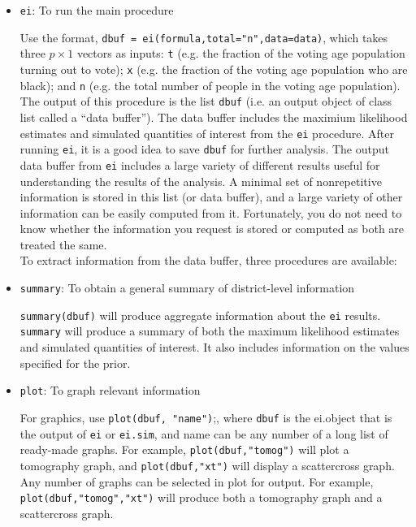 \documentclass[11pt,oneside,letterpaper,titlepage]{article}
\begin{document}
\begin{itemize}
\item{{\verb#ei#}: To run the main procedure}

  Use the format, \verb#dbuf = ei(formula,total="n",data=data)#, which takes three $
  p\times 1$ vectors as inputs: \verb#t# (e.g. the fraction of the
  voting age population turning out to vote); \verb#x# (e.g. the
  fraction of the voting age population who are black); and \verb#n#
  (e.g. the total number of people in the voting age population). The output of this
  procedure is the list \verb#dbuf# (i.e. an output object of class
  list called a ``data buffer'').  The data buffer includes the maximium likelihood estimates and simulated quantities of interest from the \verb#ei# procedure. After running \verb#ei#, it is a
  good idea to save \verb#dbuf# for further analysis.  The
  output data buffer from \verb#ei# includes a large variety of
  different results useful for understanding the results of the
  analysis. A minimal set of nonrepetitive information is stored in
  this list (or data buffer), and a large variety of other information
  can be easily computed from it. Fortunately, you do not need to know
  whether the information
  you request is stored or computed as both are treated the same.\\
  \newline To extract information from the data buffer, three
  procedures are available:

\item{{\verb#summary#}: To obtain a general summary of district-level information}

  \verb#summary(dbuf)# will produce aggregate information about the
  \verb#ei# results.  \verb#summary# will produce a summary of both the maximum likelihood estimates and simulated quantities of interest. It also includes information on the values specified for the prior.

\item{{\verb#plot#}: To graph relevant information}

  For graphics, use \verb#plot(dbuf, "name")#;, where \verb#dbuf# is
  the ei.object that is the output of \verb#ei# or \verb#ei.sim#, and name can be any number
  of a long list of ready-made graphs.  For example,
  \verb#plot(dbuf,"tomog")# will plot a tomography graph, and
  \verb#plot(dbuf,"xt")# will display a scattercross graph. Any number
  of graphs can be selected in plot for output.  For example,
  \verb#plot(dbuf,"tomog","xt")# will produce both a tomography graph
  and a scattercross graph.


\end{itemize}
\end{document}
